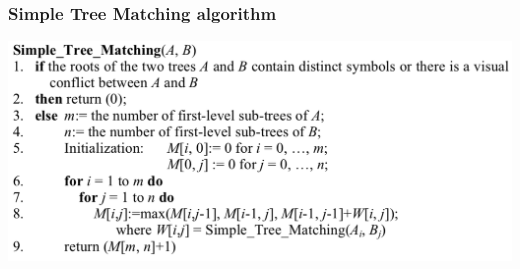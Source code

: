\documentclass[svgnames]{beamer}
\begin{document}

\begin{frame} \frametitle{Simple Tree Matching algorithm}
  
  \centering
  \includegraphics[width=\linewidth]{stm}

\end{frame}

\end{document}
